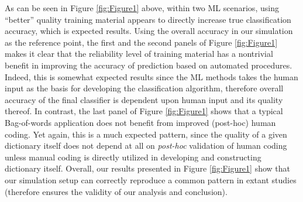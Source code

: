 \documentclass[man, 12pt, a4paper, nolmodern, noextraspace]{apa6}
\begin{document}
As can be seen in Figure \ref{fig:Figure1} above, within two ML scenarios, using \enquote{better} quality training material appears to directly increase true classification accuracy, which is expected results. Using the overall accuracy in our simulation as the reference point, the first and the second panels of Figure \ref{fig:Figure1} makes it clear that the reliability level of training material has a nontrivial benefit in improving the accuracy of prediction based on automated procedures. Indeed, this is somewhat expected results since the ML methods takes the human input as the basis for developing the classification algorithm, therefore overall accuracy of the final classifier is dependent upon human input and its quality thereof. In contrast, the last panel of Figure \ref{fig:Figure1} shows that a typical Bag-of-words application does not benefit from improved (post-hoc) human coding. Yet again, this is a much expected pattern, since the quality of a given dictionary itself does not depend at all on \textit{post-hoc} validation of human coding unless manual coding is directly utilized in developing and constructing dictionary itself. Overall, our results presented in Figure \ref{fig:Figure1} show that our simulation setup can correctly reproduce a common pattern in extant studies (therefore ensures the validity of our analysis and conclusion).   
\end{document}
